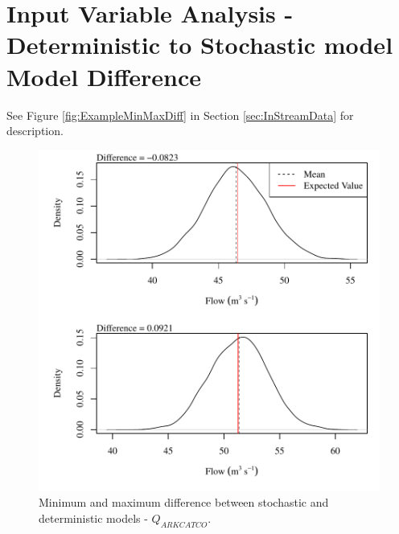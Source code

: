 \section{Input Variable Analysis - Deterministic to Stochastic model Model Difference}
\label{App:VarMinMaxDiff}

\vspace{12pt}
See Figure \ref{fig:ExampleMinMaxDiff} in Section \ref{sec:InStreamData} for description.

\begin{center}
\begin{figure}[htbp]
	\includegraphics[width=6in]{"Figures/Results_USR/V min-max diff qin"}
	\caption{Minimum and maximum difference between stochastic and deterministic models - $Q_{ARKCATCO}$.}
\end{figure}
\end{center}
\newpage

